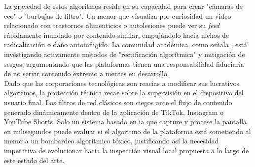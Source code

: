 La gravedad de estos algoritmos reside en su capacidad para crear "cámaras de eco" o "burbujas de filtro". Un menor que visualiza por curiosidad un video relacionado con trastornos alimenticios o autolesiones puede ver su \textit{feed} rápidamente inundado por contenido similar, empujándolo hacia nichos de radicalización o daño autoinfligido. La comunidad académica, como señala \cite{chou_rectifying_2023}, está investigando activamente métodos de "rectificación algorítmica" y mitigación de sesgos, argumentando que las plataformas tienen una responsabilidad fiduciaria de no servir contenido extremo a mentes en desarrollo.\\

Dado que las corporaciones tecnológicas son reacias a modificar sus lucrativos algoritmos, la protección técnica recae sobre la supervisión en el dispositivo del usuario final. Los filtros de red clásicos son ciegos ante el flujo de contenido generado dinámicamente dentro de la aplicación de TikTok, Instagram o YouTube Shorts. Solo un sistema basado en \gls{ia} que capture y procese la pantalla en milisegundos puede evaluar si el algoritmo de la plataforma está sometiendo al menor a un bombardeo algorítmico tóxico, justificando así la necesidad imperativa de evolucionar hacia la inspección visual local propuesta a lo largo de este estado del arte.\\